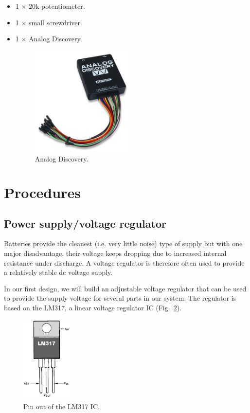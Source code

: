 \documentclass[letterpaper, 11pt]{article}
\begin{document}
\begin{itemize}[itemsep=0.5ex]
\item 1 $\times$ 20k potentiometer.
\item 1 $\times$ small screwdriver.
\item 1 $\times$ Analog Discovery.
	\begin{figure}[h]
		\centering
		\includegraphics[width=2in]{analog_discovery.png}
		\caption{Analog Discovery.}
		\label{fig:ad}
	\end{figure}
\end{itemize}

\newpage
\section{Procedures}

\subsection{Power supply/voltage regulator}
\label{sec:lm317}


Batteries provide the cleanest (i.e. very little noise) type of supply but with one major disadvantage, their voltage keeps dropping due to increased internal resistance under discharge. A voltage regulator is therefore often used to provide a relatively stable dc voltage supply.

In our first design, we will build an adjustable voltage regulator that can be used to provide the supply voltage for several parts in our system. The regulator is based on the LM317, a linear voltage regulator IC (Fig.~\ref{fig:lm317}).

\begin{figure}[h]
	\centering
	\includegraphics[width=1in]{lm317}
	\caption{Pin out of the LM317 IC.}
	\label{fig:lm317}
\end{figure}
\end{document}
